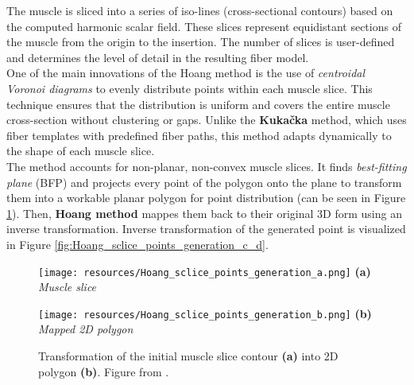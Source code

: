 \documentclass[english, bc, kiv, he, iso690alph, pdf, viewonly]{fasthesis}
\begin{document}
The muscle is sliced into a series of iso-lines (cross-sectional contours) based on the computed harmonic scalar field. These slices represent equidistant sections of the muscle from the origin to the insertion. The number of slices is user-defined and determines the level of detail in the resulting fiber model. \\

One of the main innovations of the Hoang method is the use of \textsl{centroidal Voronoi diagrams} to evenly distribute points within each muscle slice. This technique ensures that the distribution is uniform and covers the entire muscle cross-section without clustering or gaps. Unlike the \textbf{Kukačka} method, which uses fiber templates with predefined fiber paths, this method adapts dynamically to the shape of each muscle slice. \\

The method accounts for non-planar, non-convex muscle slices. It finds \textit{best-fitting plane} (BFP) and projects every point of the polygon onto the plane to transform them into a workable planar polygon for point distribution (can be seen in Figure \ref{fig:Hoang_sclice_points_generation_a_b}). Then, \textbf{Hoang method} mappes them back to their original 3D form using an inverse transformation. Inverse transformation of the generated point is visualized in Figure \ref{fig:Hoang_sclice_points_generation_c_d}. \\ 

\begin{figure}[h!]
	\centering
	\begin{minipage}[b]{0.4\textwidth}
		\centering
		\texttt{[image: resources/Hoang\_sclice\_points\_generation\_a.png]}
		\textbf{(a)} \textit{Muscle slice}
    \end{minipage}
	\hspace{0.02\textwidth}
	\begin{minipage}[b]{0.4\textwidth}
		\centering
		\texttt{[image: resources/Hoang\_sclice\_points\_generation\_b.png]}
		\textbf{(b)} \textit{Mapped 2D polygon}
    \end{minipage}

	\caption{Transformation of the initial muscle slice contour \textbf{(a)} into 2D polygon \textbf{(b)}. Figure from \cite{HOA23}.}
	\label{fig:Hoang_sclice_points_generation_a_b}
\end{figure}
\end{document}
